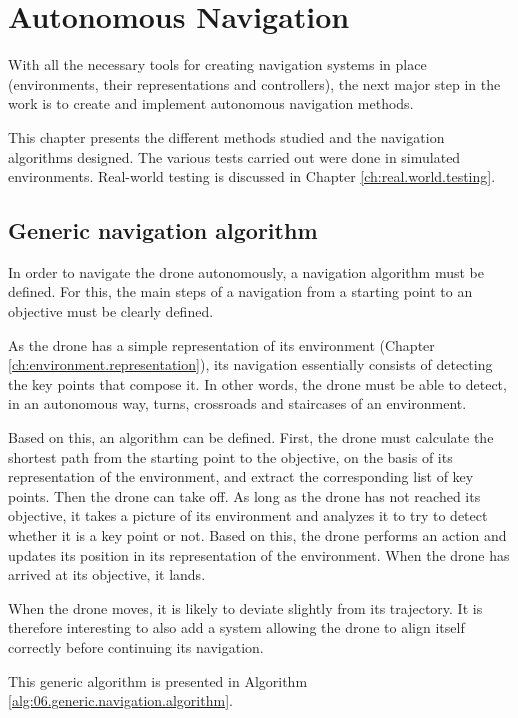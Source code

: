 \chapter{Autonomous Navigation}\label{ch:autonomous.navigation}

With all the necessary tools for creating navigation systems in place (environments, their representations and controllers), the next major step in the work is to create and implement autonomous navigation methods.

This chapter presents the different methods studied and the navigation algorithms designed. The various tests carried out were done in simulated environments. Real-world testing is discussed in Chapter \ref{ch:real.world.testing}.

\section{Generic navigation algorithm}

In order to navigate the drone autonomously, a navigation algorithm must be defined. For this, the main steps of a navigation from a starting point to an objective must be clearly defined.

As the drone has a simple representation of its environment (Chapter \ref{ch:environment.representation}), its navigation essentially consists of detecting the key points that compose it. In other words, the drone must be able to detect, in an autonomous way, turns, crossroads and staircases of an environment.

Based on this, an algorithm can be defined. First, the drone must calculate the shortest path from the starting point to the objective, on the basis of its representation of the environment, and extract the corresponding list of key points. Then the drone can take off. As long as the drone has not reached its objective, it takes a picture of its environment and analyzes it to try to detect whether it is a key point or not. Based on this, the drone performs an action and updates its position in its representation of the environment. When the drone has arrived at its objective, it lands.

When the drone moves, it is likely to deviate slightly from its trajectory. It is therefore interesting to also add a system allowing the drone to align itself correctly before continuing its navigation.

This generic algorithm is presented in Algorithm \ref{alg:06.generic.navigation.algorithm}.

